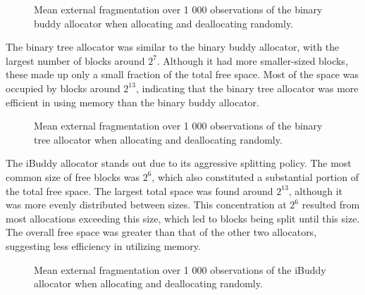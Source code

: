 \begin{figure}[h]
  \centering
  
  \caption{Mean external fragmentation over 1 000 observations of the binary buddy allocator when allocating and deallocating randomly.}
  \label{fig:fragextbinary}
\end{figure}

The binary tree allocator was similar to the binary buddy allocator, with the largest number of blocks around $2^7$. Although it had more smaller-sized blocks, these made up only a small fraction of the total free space. Most of the space was occupied by blocks around $2^{13}$, indicating that the binary tree allocator was more efficient in using memory than the binary buddy allocator.

\begin{figure}[h]
  \centering
  
  \caption{Mean external fragmentation over 1 000 observations of the binary tree allocator when allocating and deallocating randomly.}
  \label{fig:fragextbt}
\end{figure}

\newpage
The iBuddy allocator stands out due to its aggressive splitting policy. The most common size of free blocks was $2^6$, which also constituted a substantial portion of the total free space. The largest total space was found around $2^{13}$, although it was more evenly distributed between sizes. This concentration at $2^6$ resulted from most allocations exceeding this size, which led to blocks being split until this size. The overall free space was greater than that of the other two allocators, suggesting less efficiency in utilizing memory.

\begin{figure}[h]
  \centering
  
  \caption{Mean external fragmentation over 1 000 observations of the iBuddy allocator when allocating and deallocating randomly.}
  \label{fig:fragextibuddy}
\end{figure}

